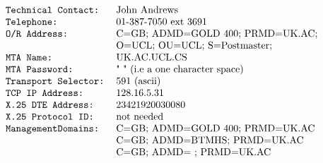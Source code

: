 \[\begin {tabular}{l l}
\tt Technical Contact:&		John Andrews\\
\tt Telephone:&			01-387-7050 ext 3691\\
\tt O/R Address:&		C=GB; ADMD=GOLD 400; PRMD=UK.AC;\\ 
\tt&				O=UCL; OU=UCL; S=Postmaster;\\
\tt MTA Name:&			UK.AC.UCL.CS\\
\tt MTA Password:&		" " (i.e a one character space)\\ 
\tt Transport Selector:&	591 (ascii)\\ 
\tt TCP IP Address:&		128.16.5.31\\
\tt X.25 DTE Address:&		23421920030080\\
\tt X.25 Protocol ID:&		not needed\\
\tt ManagementDomains:&		C=GB; ADMD=GOLD 400; PRMD=UK.AC\\
\tt&				C=GB; ADMD=BTMHS; PRMD=UK.AC\\
\tt&				C=GB; ADMD= ; PRMD=UK.AC\\
\end{tabular}\]
